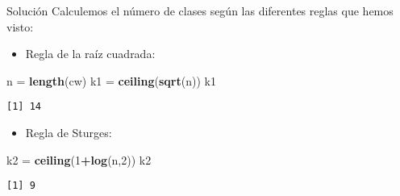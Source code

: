 \documentclass[
  ignorenonframetext,
]{beamer}
\newenvironment{Shaded}{\begin{snugshade}}{\end{snugshade}}
\newcommand{\DecValTok}[1]{\textcolor[rgb]{0.00,0.00,0.81}{#1}}
\newcommand{\KeywordTok}[1]{\textcolor[rgb]{0.13,0.29,0.53}{\textbf{#1}}}
\newcommand{\NormalTok}[1]{#1}
\newcommand{\OperatorTok}[1]{\textcolor[rgb]{0.81,0.36,0.00}{\textbf{#1}}}
\newcommand{\StringTok}[1]{\textcolor[rgb]{0.31,0.60,0.02}{#1}}
\providecommand{\tightlist}{%
  \setlength{\itemsep}{0pt}\setlength{\parskip}{0pt}}
\begin{document}
\begin{frame}[fragile]{Solución}
\protect\hypertarget{soluciuxf3n-1}{}
Calculemos el número de clases según las diferentes reglas que hemos
visto:

\begin{itemize}
\tightlist
\item
  Regla de la raíz cuadrada:
\end{itemize}

\begin{Shaded}
\begin{Highlighting}[]
\NormalTok{n =}\StringTok{ }\KeywordTok{length}\NormalTok{(cw)}
\NormalTok{k1 =}\StringTok{ }\KeywordTok{ceiling}\NormalTok{(}\KeywordTok{sqrt}\NormalTok{(n))}
\NormalTok{k1}
\end{Highlighting}
\end{Shaded}

\begin{verbatim}
[1] 14
\end{verbatim}

\begin{itemize}
\tightlist
\item
  Regla de Sturges:
\end{itemize}

\begin{Shaded}
\begin{Highlighting}[]
\NormalTok{k2 =}\StringTok{ }\KeywordTok{ceiling}\NormalTok{(}\DecValTok{1}\OperatorTok{+}\KeywordTok{log}\NormalTok{(n,}\DecValTok{2}\NormalTok{))}
\NormalTok{k2}
\end{Highlighting}
\end{Shaded}

\begin{verbatim}
[1] 9
\end{verbatim}
\end{frame}
\end{document}
